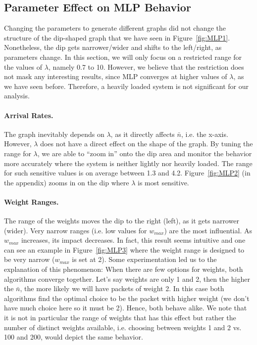 \documentclass[oribibl]{llncs}
\begin{document}
\subsection {Parameter Effect on MLP Behavior}
Changing  the parameters to generate different graphs
did not change the structure of the dip-shaped graph that we have seen in Figure~\ref{fig:MLP1}. Nonetheless, the
dip gets narrower/wider and shifts to the left/right, as parameters
change.  In this
section, we will only focus on a restricted range for the values of
$\lambda$, namely 0.7 to 10. However, we believe that the restriction does not
mask any interesting results, since MLP converges at higher values
of $\lambda$, as we have seen before. Therefore, a heavily loaded
system is not significant for our analysis.   

\paragraph{Arrival Rates.} The graph inevitably depends on $\lambda$,
as it directly affects $\bar{n}$, i.e. the x-axis. However,
$\lambda$ does not have a direct effect on the shape of the graph. By tuning the range for $\lambda$, we are able to ``zoom in''
onto the dip area and monitor the behavior more accurately where the
system is neither lightly nor heavily loaded. The range for such
sensitive values is on average between 1.3 and
4.2. Figure~\ref{fig:MLP2} (in the appendix) zooms in on the dip where $\lambda$ is most
sensitive.  


\paragraph{Weight Ranges.} The range of the weights moves the dip to
the right (left), as it gets narrower (wider). Very narrow ranges
(i.e. low values for $w_{max}$) are the most influential. As $w_{max}$
increases, its impact decreases. In fact, this result seems intuitive
and one can see an example in Figure~\ref{fig:MLP3} where the weight
range is designed to be very narrow ($w_{max}$ is set at
2). Some
experimentation led us to the explanation of this phenomenon: When
there are few options for weights, both algorithms converge
together. Let's say weights are only 1 and 2, then the higher the
$\bar{n}$, the more likely we will have packets of weight 2. In this
case both algorithms find the optimal choice to be the packet with
higher weight (we don't have much choice here so it must be 2). Hence,
both behave alike. We note that it is not in particular the range of
weights that has this effect but rather the number of distinct weights
available, i.e. choosing between weights 1 and 2 vs. 100 and 200,
would depict the same behavior.  
\end{document}
